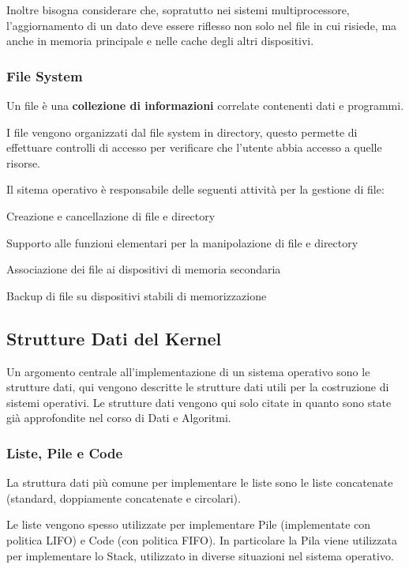 \begin{note}
    Inoltre bisogna considerare che, sopratutto nei sistemi multiprocessore, l'aggiornamento di un dato deve essere riflesso non solo nel file in cui risiede, ma anche in memoria principale e nelle cache degli altri dispositivi.
\end{note}

\subsubsection{File System}
Un file è una \textbf{collezione di informazioni} correlate contenenti dati e programmi.

I file vengono organizzati dal file system in directory, questo permette di effettuare controlli di accesso per verificare che l'utente abbia accesso a quelle risorse.

\spacer
Il sitema operativo è responsabile delle seguenti attività per la gestione di file:
\begin{sitemize}
    \item Creazione e cancellazione di file e directory
    \item Supporto alle funzioni elementari per la manipolazione di file e directory
    \item Associazione dei file ai dispositivi di memoria secondaria
    \item Backup di file su dispositivi stabili di memorizzazione
\end{sitemize}

\subsection{Strutture Dati del Kernel}
Un argomento centrale all'implementazione di un sistema operativo sono le strutture dati, qui vengono descritte le strutture dati utili per la costruzione di sistemi operativi.
Le strutture dati vengono qui solo citate in quanto sono state già approfondite nel corso di Dati e Algoritmi.

\subsubsection{Liste, Pile e Code}
La struttura dati più comune per implementare le liste sono le liste concatenate (standard, doppiamente concatenate e circolari).

Le liste vengono spesso utilizzate per implementare Pile (implementate con politica LIFO) e Code (con politica FIFO).
In particolare la Pila viene utilizzata per implementare lo Stack, utilizzato in diverse situazioni nel sistema operativo.

